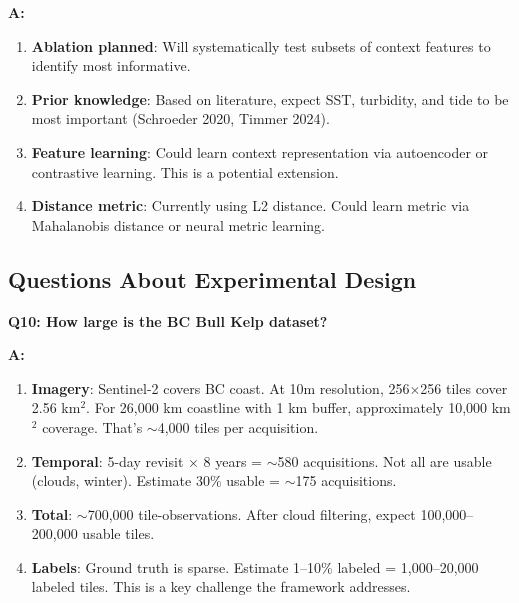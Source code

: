 \documentclass[11pt]{article}
\begin{document}
\textbf{A:}

\begin{enumerate}
    \item \textbf{Ablation planned}: Will systematically test subsets of context features to identify most informative.

    \item \textbf{Prior knowledge}: Based on literature, expect SST, turbidity, and tide to be most important (Schroeder 2020, Timmer 2024).

    \item \textbf{Feature learning}: Could learn context representation via autoencoder or contrastive learning. This is a potential extension.

    \item \textbf{Distance metric}: Currently using L2 distance. Could learn metric via Mahalanobis distance or neural metric learning.
\end{enumerate}

\subsection{Questions About Experimental Design}

\textbf{Q10: How large is the BC Bull Kelp dataset?}

\textbf{A:}

\begin{enumerate}
    \item \textbf{Imagery}: Sentinel-2 covers BC coast. At 10m resolution, 256$\times$256 tiles cover 2.56 km$^2$. For 26,000 km coastline with 1 km buffer, approximately 10,000 km$^2$ coverage. That's $\sim$4,000 tiles per acquisition.

    \item \textbf{Temporal}: 5-day revisit $\times$ 8 years = $\sim$580 acquisitions. Not all are usable (clouds, winter). Estimate 30\% usable = $\sim$175 acquisitions.

    \item \textbf{Total}: $\sim$700,000 tile-observations. After cloud filtering, expect 100,000--200,000 usable tiles.

    \item \textbf{Labels}: Ground truth is sparse. Estimate 1--10\% labeled = 1,000--20,000 labeled tiles. This is a key challenge the framework addresses.
\end{enumerate}
\end{document}
